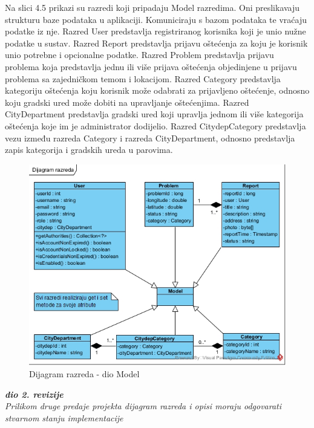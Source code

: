 Na slici 4.5 prikazi su razredi koji pripadaju Model razredima. Oni preslikavaju strukturu baze podataka
u aplikaciji. Komuniciraju s bazom podataka te vraćaju podatke iz nje. Razred User predstavlja registriranog
korisnika koji je unio nužne podatke u sustav. Razred Report predstavlja prijavu oštećenja za koju je korisnik
unio potrebne i opcionalne podatke. Razred Problem predstavlja prijavu problema koja predstavlja jednu ili više
prijava oštećenja objedinjene u prijavu problema sa zajedničkom temom i lokacijom. Razred Category predstavlja 
kategoriju oštećenja koju korisnik može odabrati za prijavljeno oštećenje, odnosno koju gradski ured može dobiti
na upravljanje oštećenjima. Razred CityDepartment predstavlja gradski ured koji upravlja jednom ili više 
kategorija oštećenja koje im je administrator dodijelio. Razred CitydepCategory predstavlja vezu između
razreda Category i razreda CityDepartment, odnosno predstavlja zapis kategorija i gradskih ureda u parovima.


\begin{figure}[H]
	\includegraphics[scale=0.60]{slike/DR-model.jpg} %
	\centering
	\caption{Dijagram razreda - dio Model}
	\label{fig:DijagramRazredaModel}
\end{figure}


\textbf{\textit{dio 2. revizije}}\\

\textit{Prilikom druge predaje projekta dijagram razreda i opisi moraju odgovarati stvarnom stanju implementacije}



